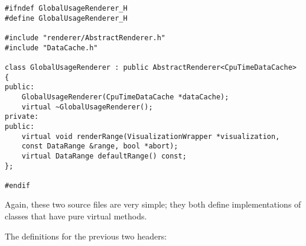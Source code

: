 \begin{lstlisting}
#ifndef GlobalUsageRenderer_H
#define GlobalUsageRenderer_H

#include "renderer/AbstractRenderer.h"
#include "DataCache.h"

class GlobalUsageRenderer : public AbstractRenderer<CpuTimeDataCache> {
public:
    GlobalUsageRenderer(CpuTimeDataCache *dataCache);
    virtual ~GlobalUsageRenderer();
private:
public:
    virtual void renderRange(VisualizationWrapper *visualization,
	const DataRange &range, bool *abort);
    virtual DataRange defaultRange() const;
};

#endif
\end{lstlisting}

Again, these two source files are very simple; they both define implementations of classes that have pure virtual
methods.

The definitions for the previous two headers:

